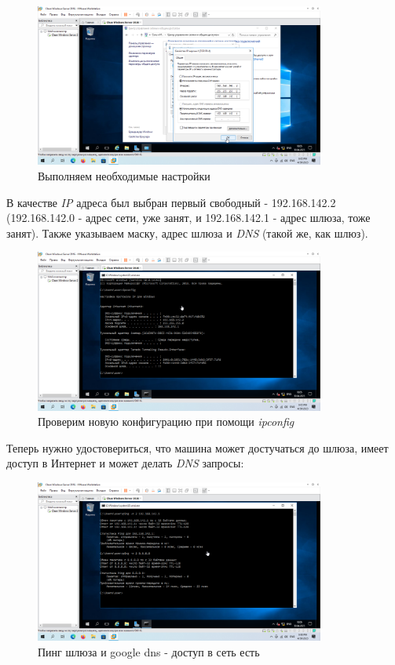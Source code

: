 \documentclass[a4paper]{article}
\begin{document}
  \begin{figure}[H]
    \centering
    \includegraphics[width=0.85\textwidth]{Screenshot_26}
    \caption{Выполняем необходимые настройки}
    \label{img:26}
  \end{figure}

  В качестве \textit{IP} адреса был выбран первый свободный - 192.168.142.2 (192.168.142.0 - адрес сети, уже занят, и
  192.168.142.1 - адрес шлюза, тоже занят). Также указываем маску, адрес шлюза и \textit{DNS} (такой же, как шлюз).

  \begin{figure}[H]
    \centering
    \includegraphics[width=0.85\textwidth]{Screenshot_27}
    \caption{Проверим новую конфигурацию при помощи \textit{ipconfig}}
    \label{img:27}
  \end{figure}

  Теперь нужно удостовериться, что машина может достучаться до шлюза, имеет доступ в Интернет
  и может делать \textit{DNS} запросы:

  \begin{figure}[H]
    \centering
    \includegraphics[width=0.85\textwidth]{Screenshot_29}
    \caption{Пинг шлюза и google dns - доступ в сеть есть}
    \label{img:29}
  \end{figure}
\end{document}
